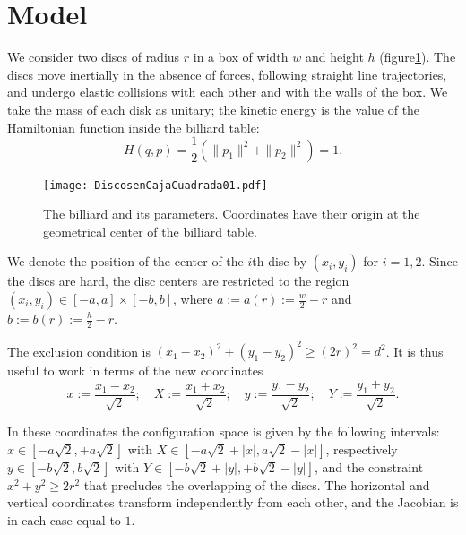 \documentclass[letterpaper,10pt, jcp, aps]{revtex4-1}
\newcommand{\defeq}{:=}
\begin{document}
\section{Model}


We consider two discs of radius $r$  %
in a box of width $w$ and height $h$ (figure\ref{billar01}). 
The discs move inertially in the absence of forces, 
following straight line trajectories,
and undergo elastic collisions with each 
other and with the walls of the box.
We take the mass of each disk as unitary; the kinetic energy
is the value of the Hamiltonian function inside the billiard table:
\begin{equation}
H(q,p)=\frac{1}{2}(\|p_1\|^2+\|p_2\|^2)=1.
\end{equation}

\begin{figure}[h]
  \begin{center}
  \texttt{[image: DiscosenCajaCuadrada01.pdf]}
  \end{center}
  \caption{The billiard and its parameters. Coordinates
    have their origin at the geometrical center of the 
    billiard table.}\label{billar01}
\end{figure}

We denote the position of the center of the $i$th disc by 
$(x_{i}, y_{i})$ for $i=1,2$. Since the discs are hard, 
the disc centers are restricted to the region 
$(x_i, y_i) \in [-a,a] \times [-b, b]$, where 
$a \defeq a(r) \defeq \frac{w}{2} - r $ and
$b \defeq b(r) \defeq \frac{h}{2} - r $.


The exclusion condition is $(x_1-x_2)^2 + (y_1-y_2)^2 \ge (2r)^2 = d^2$.
It is thus useful to work in terms of the new coordinates
\begin{equation}\label{cambiocoor01}
 x \defeq \frac{x_1 - x_2}{\sqrt{2}}; 
\quad X \defeq \frac{x_1 + x_2}{\sqrt{2}}; 
\quad y \defeq \frac{y_1 - y_2}{\sqrt{2}}; 
\quad Y \defeq \frac{y_1 + y_2}{\sqrt{2}}.
\end{equation}

In these coordinates the configuration space is given by the following
intervals:
$x \in [-a \sqrt{2}, +a \sqrt{2}]$ with 
$X \in [-a \sqrt{2} + |x|, a \sqrt{2} - |x|]$, respectively 
 $y \in [-b \sqrt{2}, b \sqrt{2}]$ with $Y \in [-b \sqrt{2} + |y|, +b \sqrt{2} - |y|]$,  
and the constraint $x^2 + y^2 \ge 2 r^2$ that precludes the overlapping of
the discs.
The horizontal and vertical coordinates transform independently
from each other, and the Jacobian is in each case equal to $1$.
\end{document}
